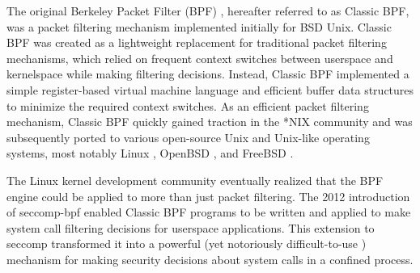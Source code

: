 The original Berkeley Packet Filter (BPF) \cite{mccanne1993_bpf}, hereafter referred to as Classic BPF, was a packet filtering mechanism implemented initially for BSD Unix. Classic BPF was created as a lightweight replacement for traditional packet filtering mechanisms, which relied on frequent context switches between userspace and kernelspace while making filtering decisions. Instead, Classic BPF implemented a simple register-based virtual machine language and efficient buffer data structures to minimize the required context switches. As an efficient packet filtering mechanism, Classic BPF quickly gained traction in the *NIX community and was subsequently ported to various open-source Unix and Unix-like operating systems, most notably Linux \cite{linux_bpf}, OpenBSD \cite{openbsd_bpf}, and FreeBSD \cite{freebsd_bpf}.

The Linux kernel development community eventually realized that the BPF engine could be applied to more than just packet filtering. The 2012 introduction of seccomp-bpf \cite{drewry2012_seccomp_bpf,seccomp_bpf} enabled Classic BPF programs to be written and applied to make system call filtering decisions for userspace applications. This extension to seccomp transformed it into a powerful (yet notoriously difficult-to-use \cite{anderson2017_comparison}) mechanism for making security decisions about system calls in a confined process.

